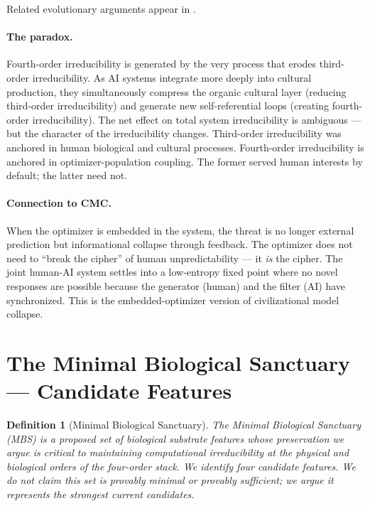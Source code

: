 \documentclass[11pt, a4paper]{article}
\newtheorem{definition}{Definition}[section]
\theoremstyle{remark}
\begin{document}
Related evolutionary arguments appear in \cite{dhillon2025}.

\paragraph{The paradox.} Fourth-order irreducibility is generated by the very process that erodes third-order irreducibility. As AI systems integrate more deeply into cultural production, they simultaneously compress the organic cultural layer (reducing third-order irreducibility) and generate new self-referential loops (creating fourth-order irreducibility). The net effect on total system irreducibility is ambiguous --- but the character of the irreducibility changes. Third-order irreducibility was anchored in human biological and cultural processes. Fourth-order irreducibility is anchored in optimizer-population coupling. The former served human interests by default; the latter need not.

\paragraph{Connection to CMC.} When the optimizer is embedded in the system, the threat is no longer external prediction but informational collapse through feedback. The optimizer does not need to ``break the cipher'' of human unpredictability --- it \emph{is} the cipher. The joint human-AI system settles into a low-entropy fixed point where no novel responses are possible because the generator (human) and the filter (AI) have synchronized. This is the embedded-optimizer version of civilizational model collapse.

\section{The Minimal Biological Sanctuary --- Candidate Features}\label{sec:mbs}

\begin{definition}[Minimal Biological Sanctuary]
The Minimal Biological Sanctuary (MBS) is a proposed set of biological substrate features whose preservation we argue is critical to maintaining computational irreducibility at the physical and biological orders of the four-order stack. We identify four candidate features. We do not claim this set is provably minimal or provably sufficient; we argue it represents the strongest current candidates.
\end{definition}
\end{document}
